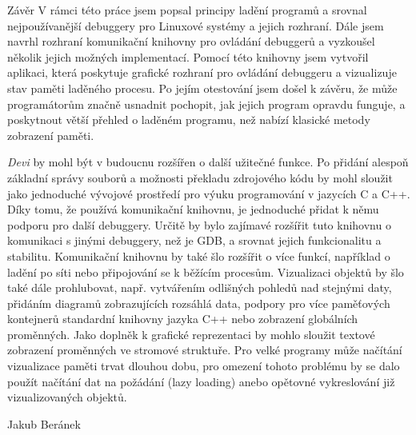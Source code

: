 \documentclass[czech,bachelor,male,python,dept460]{diploma}						%
\newcommand{\parspace}[1][]{
	\ifthenelse{\isempty{#1}}{\vspace{5mm}}{\vspace{#1}}
	\par
}
\begin{document}
\begin{section}{Závěr}
\label{sec:Conclusion}
	V rámci této práce jsem popsal principy ladění programů a srovnal nejpoužívanější debuggery pro Linuxové systémy a jejich rozhraní. Dále jsem
	navrhl rozhraní komunikační knihovny pro ovládání debuggerů a vyzkoušel několik jejich možných implementací. Pomocí této knihovny jsem
	vytvořil aplikaci, která poskytuje grafické rozhraní pro ovládání debuggeru a vizualizuje stav paměti laděného procesu. Po jejím otestování jsem
	došel k závěru, že může programátorům značně usnadnit pochopit, jak jejich program opravdu funguje, a poskytnout větší přehled o laděném programu, než
	nabízí klasické metody zobrazení paměti.

	\parspace \textit{Devi} by mohl být v budoucnu rozšířen o další užitečné funkce. Po přidání alespoň základní správy souborů a možnosti překladu
	zdrojového kódu by mohl sloužit jako jednoduché vývojové prostředí pro výuku programování v jazycích C a C++.
	Díky tomu, že používá komunikační knihovnu, je jednoduché přidat k němu podporu pro další debuggery. Určitě by bylo
	zajímavé rozšířit tuto knihovnu o komunikaci s jinými debuggery, než je GDB, a srovnat jejich funkcionalitu a stabilitu.
	Komunikační knihovnu by také šlo rozšířit o více funkcí, například o ladění po síti nebo připojování se k běžícím procesům.
	Vizualizaci objektů by šlo také dále prohlubovat, např. vytvářením odlišných pohledů nad stejnými daty, přidáním diagramů zobrazujících rozsáhlá data,
	podpory pro více paměťových kontejnerů standardní knihovny jazyka C++ nebo zobrazení globálních proměnných.
	Jako doplněk k grafické reprezentaci by mohlo sloužit textové zobrazení proměnných ve stromové struktuře.
	Pro velké programy může načítání vizualizace paměti trvat dlouhou dobu, pro omezení tohoto problému by se dalo použít načítání dat na požádání
	(lazy loading) anebo opětovné vykreslování již vizualizovaných objektů.
\end{section}

\bigskip
\begin{flushright}
Jakub Beránek
\end{flushright}

\printbibheading[title=Literatura, heading=bibintoc]
\printbibliography[heading=none]
\end{document}
